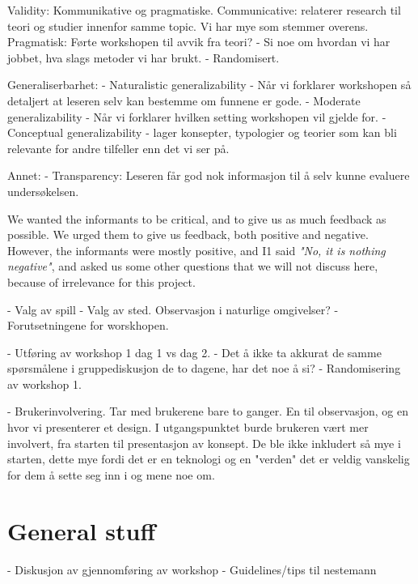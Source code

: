 Validity:
Kommunikative og pragmatiske. Communicative: relaterer research til teori og studier innenfor samme topic. Vi har mye som stemmer overens.
Pragmatisk: Førte workshopen til avvik fra teori?
- Si noe om hvordan vi har jobbet, hva slags metoder vi har brukt.
- Randomisert. 

Generaliserbarhet:
- Naturalistic generalizability - Når vi forklarer workshopen så detaljert at leseren selv kan bestemme om funnene er gode. 
- Moderate generalizability - Når vi forklarer hvilken setting workshopen vil gjelde for. 
- Conceptual generalizability - lager konsepter, typologier og teorier som kan bli relevante for andre tilfeller enn det vi ser på. 

Annet:
- Transparency: Leseren får god nok informasjon til å selv kunne evaluere undersøkelsen.

We wanted the informants to be critical, and to give us as much feedback as possible. We urged them to give us feedback, both positive and negative. However, the informants were mostly positive, and I1 said \emph{"No, it is nothing negative"}, and asked us some other questions that we will not discuss here, because of irrelevance for this project. 


- Valg av spill
- Valg av sted. Observasjon i naturlige omgivelser?
- Forutsetningene for worskhopen. 

- Utføring av workshop 1 dag 1 vs dag 2.
- Det å ikke ta akkurat de samme spørsmålene i gruppediskusjon de to dagene, har det noe å si?
- Randomisering av workshop 1. 



- Brukerinvolvering. Tar med brukerene bare to ganger. En til observasjon, og en hvor vi presenterer et design. I utgangspunktet burde brukeren vært mer involvert, fra starten til presentasjon av konsept. De ble ikke inkludert så mye i starten, dette mye fordi det er en teknologi og en "verden" det er veldig vanskelig for dem å sette seg inn i og mene noe om. 

\section{General stuff}
- Diskusjon av gjennomføring av workshop
- Guidelines/tips til nestemann
